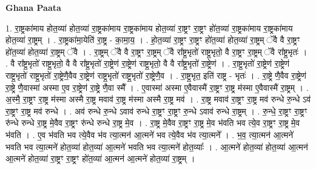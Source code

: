 \documentclass[17pt]{extarticle}
\begin{document}
\textbf{Ghana Paata } \newline

1. रा॒ष्ट्रका॑माय होत॒व्या॑ होत॒व्या॑ रा॒ष्ट्रका॑माय रा॒ष्ट्रका॑माय होत॒व्या॑ रा॒ष्ट्रꣳ रा॒ष्ट्रꣳ हो॑त॒व्या॑ रा॒ष्ट्रका॑माय रा॒ष्ट्रका॑माय होत॒व्या॑ रा॒ष्ट्रम् । . रा॒ष्ट्रका॑मा॒येति॑ रा॒ष्ट्र - का॒मा॒य॒ । . हो॒त॒व्या॑ रा॒ष्ट्रꣳ रा॒ष्ट्रꣳ हो॑त॒व्या॑ होत॒व्या॑ रा॒ष्ट्रम् ॅवै वै रा॒ष्ट्रꣳ हो॑त॒व्या॑ होत॒व्या॑ रा॒ष्ट्रम् ॅवै । . रा॒ष्ट्रम् ॅवै वै रा॒ष्ट्रꣳ रा॒ष्ट्रम् ॅवै रा᳚ष्ट्र॒भृतो॑ राष्ट्र॒भृतो॒ वै रा॒ष्ट्रꣳ रा॒ष्ट्रम् ॅवै रा᳚ष्ट्र॒भृतः॑ । . वै रा᳚ष्ट्र॒भृतो॑ राष्ट्र॒भृतो॒ वै वै रा᳚ष्ट्र॒भृतो॑ रा॒ष्ट्रेण॑ रा॒ष्ट्रेण॑ राष्ट्र॒भृतो॒ वै वै 
रा᳚ष्ट्र॒भृतो॑ रा॒ष्ट्रेण॑ । . रा॒ष्ट्र॒भृतो॑ रा॒ष्ट्रेण॑ रा॒ष्ट्रेण॑ राष्ट्र॒भृतो॑ राष्ट्र॒भृतो॑ रा॒ष्ट्रेणै॒वैव रा॒ष्ट्रेण॑ राष्ट्र॒भृतो॑ राष्ट्र॒भृतो॑ रा॒ष्ट्रेणै॒व । . रा॒ष्ट्र॒भृत॒ इति॑ राष्ट्र - भृतः॑ । . रा॒ष्ट्रे णै॒वैव रा॒ष्ट्रेण॑ रा॒ष्ट्रे णै॒वास्मा॑ अस्मा ए॒व रा॒ष्ट्रेण॑ रा॒ष्ट्रे णै॒वा स्मै᳚ । . ए॒वास्मा॑ अस्मा ए॒वैवास्मै॑ रा॒ष्ट्रꣳ रा॒ष्ट्र म॑स्मा ए॒वैवास्मै॑ रा॒ष्ट्रम् । . अ॒स्मै॒ रा॒ष्ट्रꣳ रा॒ष्ट्र म॑स्मा अस्मै रा॒ष्ट्र मवाव॑ रा॒ष्ट्र म॑स्मा अस्मै रा॒ष्ट्र मव॑ । . रा॒ष्ट्र मवाव॑ रा॒ष्ट्रꣳ रा॒ष्ट्र मव॑ रुन्धे रु॒न्धे ऽव॑ रा॒ष्ट्रꣳ रा॒ष्ट्र मव॑ रुन्धे । . अव॑ रुन्धे रु॒न्धे ऽवाव॑ रुन्धे रा॒ष्ट्रꣳ रा॒ष्ट्रꣳ रु॒न्धे ऽवाव॑ रुन्धे रा॒ष्ट्रम् । . रु॒न्धे॒ रा॒ष्ट्रꣳ रा॒ष्ट्रꣳ रु॑न्धे रुन्धे रा॒ष्ट्र मे॒वैव रा॒ष्ट्रꣳ रु॑न्धे रुन्धे रा॒ष्ट्र मे॒व । . रा॒ष्ट्र मे॒वैव रा॒ष्ट्रꣳ रा॒ष्ट्र मे॒व भ॑वति भव त्ये॒व रा॒ष्ट्रꣳ रा॒ष्ट्र मे॒व भ॑वति । . ए॒व भ॑वति भव त्ये॒वैव भ॑व त्या॒त्मन॑ आ॒त्मने॑ भव त्ये॒वैव भ॑व त्या॒त्मने᳚ । . भ॒व॒ त्या॒त्मन॑ आ॒त्मने॑ भवति भव त्या॒त्मने॑ होत॒व्या॑ होत॒व्या॑ आ॒त्मने॑ भवति भव त्या॒त्मने॑ होत॒व्याः᳚ । . आ॒त्मने॑ होत॒व्या॑ होत॒व्या॑ आ॒त्मन॑ आ॒त्मने॑ होत॒व्या॑ रा॒ष्ट्रꣳ रा॒ष्ट्रꣳ हो॑त॒व्या॑ आ॒त्मन॑ आ॒त्मने॑ होत॒व्या॑ रा॒ष्ट्रम् । \newline
\end{document}
